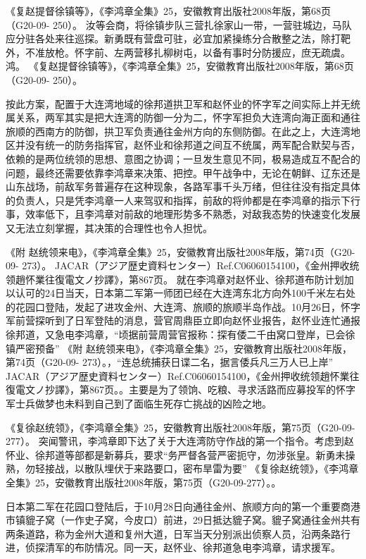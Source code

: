 \documentclass[12pt,UTF8]{ctexbook}
\begin{document}
《复赵提督徐镇等》，《李鸿章全集》25，安徽教育出版社2008年版，第68页（G20-09- 250）。
汝等会商，将徐镇步队三营扎徐家山一带，一营驻城边，马队应分驻各处来往巡探。新勇既有营盘可驻，必宜加紧操练分合散整之法，除打靶外，不准放枪。怀字前、左两营移扎柳树屯，以备有事时分防援应，庶无疏虞。鸿。 《复赵提督徐镇等》，《李鸿章全集》25，安徽教育出版社2008年版，第68页（G20-09- 250）。

按此方案，配置于大连湾地域的徐邦道拱卫军和赵怀业的怀字军之间实际上并无统属关系，两军其实是把大连湾的防御一分为二，怀字军担负大连湾向海正面和通往旅顺的西南方的防御，拱卫军负责通往金州方向的东侧防御。在此之上，大连湾地区并没有统一的防务指挥官，赵怀业和徐邦道之间互不统属，两军配合默契与否，依赖的是两位统领的思想、意图之协调；一旦发生意见不同，极易造成互不配合的问题，最终还需要依靠李鸿章来决策、把控。甲午战争中，无论在朝鲜、辽东还是山东战场，前敌军务普遍存在这种现象，各路军事千头万绪，但往往没有指定具体的负责人，只是凭李鸿章一人来驾驭和指挥，前敌的将帅都是在李鸿章的指示下行事，效率低下，且李鸿章对前敌的地理形势多不熟悉，对敌我态势的快速变化发展又无法立刻掌握，其决策的合理性也令人担忧。

《附 赵统领来电》，《李鸿章全集》25，安徽教育出版社2008年版，第74页（G20-09- 273）。
JACAR（アジア歴史資料センター）Ref.C06060154100，《金州押收统领趙怀業往復電文ノ抄譯》，第867页。
就在李鸿章对赵怀业、徐邦道布防计划加以认可的24日当天，日本第二军第一师团已经在大连湾东北方向外100千米左右处的花园口登陆，发起了进攻金州、大连湾、旅顺的旅顺半岛作战。10月26日，怀字军前营探听到了日军登陆的消息，营官周鼎臣立即向赵怀业报告，赵怀业连忙通报徐邦道，又急电李鸿章，“顷据前营周营官报称：探有倭二千由窝口登岸，已会徐镇严密预备” 《附 赵统领来电》，《李鸿章全集》25，安徽教育出版社2008年版，第74页（G20-09- 273）。，“连总统捕获日谍二名，据言倭兵凡三万人已上岸” JACAR（アジア歴史資料センター）Ref.C06060154100，《金州押收统领趙怀業往復電文ノ抄譯》，第867页。。主要是为了领饷、吃粮、寻求活路而应募投军的怀字军士兵做梦也未料到自己到了面临生死存亡挑战的凶险之地。

《复徐赵统领》，《李鸿章全集》25，安徽教育出版社2008年版，第75页（G20-09-277）。
突闻警讯，李鸿章即下达了关于大连湾防守作战的第一个指令。考虑到赵怀业、徐邦道等部都是新募兵，要求“务严督各营严密扼守，勿涉张皇。新勇未操熟，勿轻接战，以散队埋伏于来路要口，密布旱雷为要” 《复徐赵统领》，《李鸿章全集》25，安徽教育出版社2008年版，第75页（G20-09-277）。。

日本第二军在花园口登陆后，于10月28日向通往金州、旅顺方向的第一个重要商港市镇貔子窝（一作史子窝，今皮口）前进，29日抵达貔子窝。貔子窝通往金州共有两条道路，称为金州大道和复州大道，日军当天分别派出侦察人员，沿两条路行进，侦探清军的布防情况。同一天，赵怀业、徐邦道急电李鸿章，请求援军。
\end{document}
